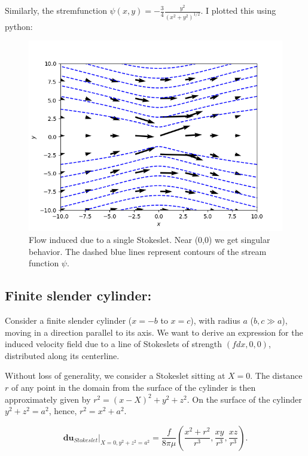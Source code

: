 \documentclass{article}
\begin{document}
Similarly, the stremfunction $\psi(x, y) = -\frac{3}{4} \frac{y^{2}}{(x^{2}+y^{2})^{1/2}}$. I plotted this using python:
\begin{figure}[H]
    \centering
    \includegraphics[scale = 0.8]{Figs/stokeslet.png}
    \caption{Flow induced due to a single Stokeslet. Near (0,0) we get singular behavior. The dashed blue lines represent contours of the stream function $\psi$.}
    \label{fig:stokeslet}
\end{figure}

%
\subsection*{Finite slender cylinder:}
Consider a finite slender cylinder ($x=-b$ to $x=c$), with radius $a$ ($b, c \gg a$), moving in a direction parallel to its axis. We want to derive an expression for the induced velocity field due to a line of Stokeslets of strength $(fdx, 0, 0)$, distributed along its centerline. 

Without loss of generality, we consider a Stokeslet sitting at $X=0$. The distance $r$ of any point in the domain from the surface of the cylinder is then approximately given by $r^{2} = (x-X)^{2} + y^{2} + z^{2}$. On the surface of the cylinder $y^{2} + z^{2} = a^{2}$, hence, $\boxed{r^{2} = x^{2} + a^{2}}$. 

\begin{equation}\label{eq:du_stokeslet}
 \boldsymbol{du}_{Stokeslet}\bigg|_{X = 0, y^{2}+z^{2} = a^{2}} = \frac{f}{8\pi \mu} \left(\frac{x^{2} + r^{2}}{r^{3}}, \frac{xy}{r^{3}}, \frac{xz}{r^{3}} \right).
\end{equation}
\end{document}
